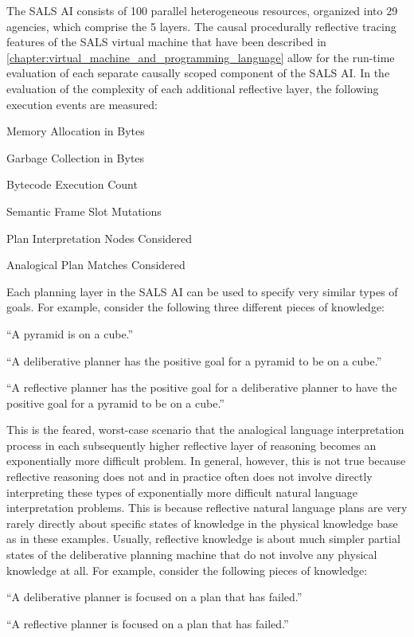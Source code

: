 The SALS AI consists of 100 parallel heterogeneous resources,
organized into 29 agencies, which comprise the 5 layers.  The causal
procedurally reflective tracing features of the SALS virtual machine
that have been described in
{\mbox{\autoref{chapter:virtual_machine_and_programming_language}}}
allow for the run-time evaluation of each separate causally scoped
component of the SALS AI.  In the evaluation of the complexity of each
additional reflective layer, the following execution events are
measured:
\begin{packed_enumerate}
\item{Memory Allocation in Bytes}
\item{Garbage Collection in Bytes}
\item{Bytecode Execution Count}
\item{Semantic Frame Slot Mutations}
\item{Plan Interpretation Nodes Considered}
\item{Analogical Plan Matches Considered}
\end{packed_enumerate}
Each planning layer in the SALS AI can be used to specify very similar
types of goals.  For example, consider the following three different
pieces of knowledge:
\begin{packed_enumerate}
\item{``A pyramid is on a cube.''}
\item{``A deliberative planner has the positive goal for a pyramid to
  be on a cube.''}
\item{``A reflective planner has the positive goal for a deliberative
  planner to have the positive goal for a pyramid to be on a cube.''}
\end{packed_enumerate}
This is the feared, worst-case scenario that the analogical language
interpretation process in each subsequently higher reflective layer of
reasoning becomes an exponentially more difficult problem.  In
general, however, this is not true because reflective reasoning does
not and in practice often does not involve directly interpreting these
types of exponentially more difficult natural language interpretation
problems.  This is because reflective natural language plans are very
rarely directly about specific states of knowledge in the physical
knowledge base as in these examples.  Usually, reflective knowledge is
about much simpler partial states of the deliberative planning machine
that do not involve any physical knowledge at all.  For example,
consider the following pieces of knowledge:
\begin{packed_enumerate}
\item{``A deliberative planner is focused on a plan that has failed.''}
\item{``A reflective planner is focused on a plan that has failed.''}
\end{packed_enumerate}


